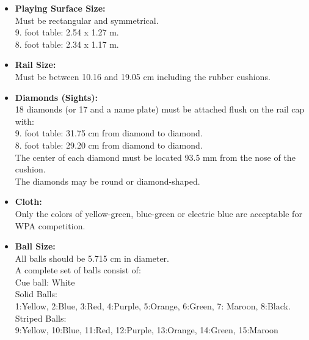 \begin{itemize}
	\item \textbf{Playing Surface Size:}\\
		Must be rectangular and symmetrical.\\
		9. foot table: 2.54 x 1.27 m.\\
		8. foot table: 2.34 x 1.17 m.\\
	\item \textbf{Rail Size:}\\
		Must be between 10.16 and 19.05 cm including the rubber cushions.\\
	\item \textbf{Diamonds (Sights):}\\
		18 diamonds (or 17 and a name plate) must be attached flush on the rail cap with:\\
		9. foot table: 31.75 cm from diamond to diamond.\\
		8. foot table: 29.20 cm from diamond to diamond.\\
		The center of each diamond must be located 93.5 mm from the nose of the cushion.\\
		The diamonds may be round or diamond-shaped.\\
	\item \textbf{Cloth:}\\
		Only the colors of yellow-green, blue-green or electric blue are acceptable for WPA competition. \\
	\item \textbf{Ball Size:}\\
		All balls should be 5.715 cm in diameter.\\
		A complete set of balls consist of:\\
		Cue ball: White\\
		Solid Balls:\\
		\hspace*{10 mm}	1:Yellow, 2:Blue, 3:Red, 4:Purple, 5:Orange, 6:Green, 7: Maroon, 8:Black.\\
		Striped Balls:\\
		\hspace*{10 mm}	9:Yellow, 10:Blue, 11:Red, 12:Purple, 13:Orange, 14:Green, 15:Maroon\\
		

\end{itemize}
